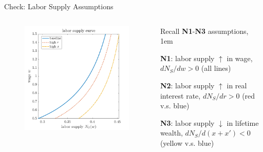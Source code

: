 \documentclass[11pt,aspectratio=43]{beamer}
\let\olditemize=\itemize
\let\endolditemize=\enditemize
\renewenvironment{itemize}{\olditemize \itemsep1em}{\endolditemize}
\theoremstyle{definition}
\begin{document}
\begin{frame}{Check: Labor Supply Assumptions}
\label{slide:Check__Labor_Supply_Assumptions}
    \begin{columns}
        \begin{column}{0.5\textwidth}
            \begin{figure}
                \includegraphics[width=\textwidth]{./figures/LaborSupplyInterestRateWealth.png}
            \end{figure}


        \end{column}
        \begin{column}{0.5\textwidth}
            Recall \textbf{N1}-\textbf{N3} assumptions,
            \begin{itemize}
                \item \textbf{N1}: labor supply $ \uparrow  $ in wage, $ d N_{S} / dw > 0 $ (all lines)
                \item \textbf{N2}: labor supply $ \uparrow  $ in real interest rate, $ d N_{S} / dr > 0 $ (red v.s. blue)
                \item \textbf{N3}: labor supply $ \downarrow  $ in lifetime wealth, $ d N_{S} / d( x + x' ) < 0 $ (yellow v.s. blue)
            \end{itemize}
        \end{column}
    \end{columns}
\end{frame}
\end{document}
